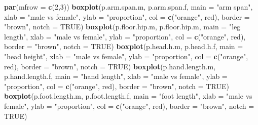 \documentclass[]{article}
\newenvironment{Shaded}{\begin{snugshade}}{\end{snugshade}}
\newcommand{\DataTypeTok}[1]{\textcolor[rgb]{0.13,0.29,0.53}{#1}}
\newcommand{\DecValTok}[1]{\textcolor[rgb]{0.00,0.00,0.81}{#1}}
\newcommand{\KeywordTok}[1]{\textcolor[rgb]{0.13,0.29,0.53}{\textbf{#1}}}
\newcommand{\NormalTok}[1]{#1}
\newcommand{\OtherTok}[1]{\textcolor[rgb]{0.56,0.35,0.01}{#1}}
\newcommand{\StringTok}[1]{\textcolor[rgb]{0.31,0.60,0.02}{#1}}
\begin{document}
\begin{Shaded}
\begin{Highlighting}[]
\KeywordTok{par}\NormalTok{(}\DataTypeTok{mfrow =} \KeywordTok{c}\NormalTok{(}\DecValTok{2}\NormalTok{,}\DecValTok{3}\NormalTok{))}
\KeywordTok{boxplot}\NormalTok{(p.arm.span.m, p.arm.span.f,}
        \DataTypeTok{main =} \StringTok{"arm span"}\NormalTok{,}
        \DataTypeTok{xlab =} \StringTok{"male vs female"}\NormalTok{,}
        \DataTypeTok{ylab =} \StringTok{"proportion"}\NormalTok{,}
        \DataTypeTok{col =} \KeywordTok{c}\NormalTok{(}\StringTok{"orange"}\NormalTok{, }\StringTok{\textquotesingle{}red\textquotesingle{}}\NormalTok{),}
        \DataTypeTok{border =} \StringTok{"brown"}\NormalTok{,}
        \DataTypeTok{notch =} \OtherTok{TRUE}\NormalTok{)}
\KeywordTok{boxplot}\NormalTok{(p.floor.hip.m, p.floor.hip.m, }
        \DataTypeTok{main =} \StringTok{"leg length"}\NormalTok{,}
        \DataTypeTok{xlab =} \StringTok{"male vs female"}\NormalTok{,}
        \DataTypeTok{ylab =} \StringTok{"proportion"}\NormalTok{,}
        \DataTypeTok{col =} \KeywordTok{c}\NormalTok{(}\StringTok{"orange"}\NormalTok{, }\StringTok{\textquotesingle{}red\textquotesingle{}}\NormalTok{),}
        \DataTypeTok{border =} \StringTok{"brown"}\NormalTok{,}
        \DataTypeTok{notch =} \OtherTok{TRUE}\NormalTok{)}
\KeywordTok{boxplot}\NormalTok{(p.head.h.m, p.head.h.f,}
        \DataTypeTok{main =} \StringTok{"head height"}\NormalTok{,}
        \DataTypeTok{xlab =} \StringTok{"male vs female"}\NormalTok{,}
        \DataTypeTok{ylab =} \StringTok{"proportion"}\NormalTok{,}
        \DataTypeTok{col =} \KeywordTok{c}\NormalTok{(}\StringTok{"orange"}\NormalTok{, }\StringTok{\textquotesingle{}red\textquotesingle{}}\NormalTok{),}
        \DataTypeTok{border =} \StringTok{"brown"}\NormalTok{,}
        \DataTypeTok{notch =} \OtherTok{TRUE}\NormalTok{)}
\KeywordTok{boxplot}\NormalTok{(p.hand.length.m, p.hand.length.f,}
        \DataTypeTok{main =} \StringTok{"hand length"}\NormalTok{,}
        \DataTypeTok{xlab =} \StringTok{"male vs female"}\NormalTok{,}
        \DataTypeTok{ylab =} \StringTok{"proportion"}\NormalTok{,}
        \DataTypeTok{col =} \KeywordTok{c}\NormalTok{(}\StringTok{"orange"}\NormalTok{, }\StringTok{\textquotesingle{}red\textquotesingle{}}\NormalTok{),}
        \DataTypeTok{border =} \StringTok{"brown"}\NormalTok{,}
        \DataTypeTok{notch =} \OtherTok{TRUE}\NormalTok{)}
\KeywordTok{boxplot}\NormalTok{(p.foot.length.m, p.foot.length.f,}
        \DataTypeTok{main =} \StringTok{"foot length"}\NormalTok{,}
        \DataTypeTok{xlab =} \StringTok{"male vs female"}\NormalTok{,}
        \DataTypeTok{ylab =} \StringTok{"proportion"}\NormalTok{,}
        \DataTypeTok{col =} \KeywordTok{c}\NormalTok{(}\StringTok{"orange"}\NormalTok{, }\StringTok{\textquotesingle{}red\textquotesingle{}}\NormalTok{),}
        \DataTypeTok{border =} \StringTok{"brown"}\NormalTok{,}
        \DataTypeTok{notch =} \OtherTok{TRUE}\NormalTok{)}
\end{Highlighting}
\end{Shaded}
\end{document}
